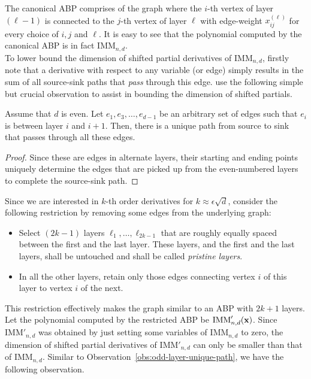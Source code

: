 The canonical ABP comprises of the graph where the $i$-th vertex of layer $(\ell-1)$ is connected to the $j$-th vertex of layer $\ell$ with edge-weight $x_{ij}^{(\ell)}$ for every choice of $i,j$ and $\ell$. It is easy to see that the polynomial computed by the canonical ABP is in fact $\mathrm{IMM}_{n,d}$. \\

To lower bound the dimension of shifted partial derivatives of $\mathrm{IMM}_{n,d}$, firstly note that a derivative with respect to any variable (or edge) simply results in the sum of all source-sink paths that \emph{pass} through this edge. \cite{FLMS13} use the following simple but crucial observation to assist in bounding the dimension of shifted partials. 

\begin{observation}\label{obs:odd-layer-unique-path}
Assume that $d$ is even. Let $e_1,e_3,\dots, e_{d-1}$ be an arbitrary set of edges such that $e_i$ is between layer $i$ and $i+1$. Then, there is a unique path from source to sink that passes through all these edges. 
\end{observation}
\begin{proof}
Since these are edges in alternate layers, their starting and ending points uniquely determine the edges that are picked up from the even-numbered layers to complete the source-sink path.
\end{proof}

Since we are interested in $k$-th order derivatives for $k \approx \epsilon \sqrt{d}$, \cite{FLMS13} consider the following restriction by removing some edges from the underlying graph:
\begin{itemize}
\item Select $(2k-1)$ layers $\ell_1,\dots, \ell_{2k-1}$ that are roughly equally spaced between the first and the last layer. These layers, and the first and the last layers, shall be untouched and shall be called \emph{pristine layers}.
\item In all the other layers, retain only those edges connecting vertex $i$ of this layer to vertex $i$  of the next. 
\end{itemize}
This restriction effectively makes the graph similar to an ABP with $2k+1$ layers. Let the polynomial computed by the restricted ABP be $\mathrm{IMM}'_{n,d}(\mathbf{x})$. Since $\mathrm{IMM}'_{n,d}$ was obtained by just setting some variables of $\mathrm{IMM}_{n,d}$ to zero, the dimension of shifted partial derivatives of $\mathrm{IMM}'_{n,d}$ can only be smaller than that of $\mathrm{IMM}_{n,d}$. Similar to Observation~\ref{obs:odd-layer-unique-path}, we have the following observation. 

